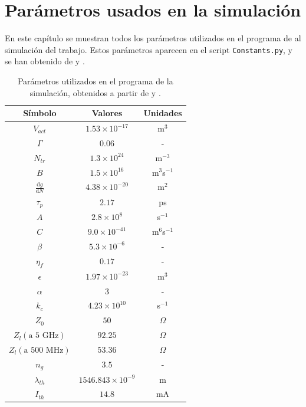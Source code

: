 \documentclass[a4paper, 11pt, oneside]{book}
\begin{document}
			
			

				
			\newpage
			\appendix


				\chapter{Par\'ametros usados en la simulación}
					\label{App:params}

					En este cap\'itulo se muestran todos los par\'ametros utilizados en el programa de al simulación del trabajo. Estos par\'ametros aparecen en el script \texttt{Constants.py}, y se han obtenido de \cite{artSim} y \cite{Chaves19}.

					\begin{table}[H]
						\centering
						\begin{tabular}{| c | c | c |}
							\hline
							S\'imbolo & Valores & Unidades \\ \hline
							$V_{act}$ & $1.53 \times 10^{-17}$ & m$^3$ \\\hline 
							$\Gamma$ & $0.06$ & - \\\hline 
							$N_{tr}$ & $1.3 \times 10^{24}$ & m$^{-3}$ \\\hline 
							$B$ & $1.5 \times 10^{16}$ & m$^3$s$^{-1}$ \\\hline 
							$\frac{\mathrm{d} g}{\mathrm{d}N}$ & $4.38 \times 10^{-20}$ & m$^2$ \\\hline 
							$\tau_p$ & $2.17$ & ps \\\hline 
							$A$ & $2.8 \times 10^8$ & s$^{-1}$ \\\hline 
							$C$ & $9.0 \times 10^{-41}$ & m$^6$s$^{-1}$ \\\hline 
							$\beta$ & $5.3 \times 10^{-6}$ & - \\\hline 
							$\eta_f$ & $0.17$ & - \\\hline 
							$\epsilon$ & $1.97 \times 10^{-23}$ & m$^3$ \\\hline 
							$\alpha$ & $3$ & - \\\hline 
							$k_c$ & $4.23 \times 10^{10}$ & s$^{-1}$ \\\hline 
							$Z_0$ & $50$ & $\Omega$ \\\hline 
							$Z_l (\textrm{a 5 GHz})$ & $92.25$ & $\Omega$ \\\hline 
							$Z_l (\textrm{a 500 MHz})$ & $53.36$ & $\Omega$ \\\hline 
							$n_g$ & $3.5$ & - \\\hline 
							$\lambda_{th}$ & $1546.843 \times 10^{-9}$ & m \\\hline 
							$I_{th}$ & $14.8$ & mA \\\hline 
						\end{tabular}
						\caption{\label{tab:param}Par\'ametros utilizados en el programa de la simulación, obtenidos a partir de \cite{artSim} y \cite{Chaves19}.}
					\end{table}
\end{document}
